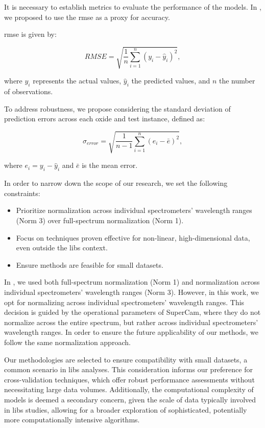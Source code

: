 It is necessary to establish metrics to evaluate the performance of the models.
In \cite{p9_paper}, we proposed to use the \gls{rmse} as a proxy for accuracy.

\gls{rmse} is given by:

\begin{equation}
    RMSE = \sqrt{\frac{1}{n} \sum_{i=1}^{n} (y_i - \hat{y}_i)^2},
\end{equation}

where $y_i$ represents the actual values, $\hat{y}_i$ the predicted values, and $n$ the number of observations.

To address robustness, we propose considering the standard deviation of prediction errors across each oxide and test instance, defined as:

\begin{equation}
    \sigma_{error} = \sqrt{\frac{1}{n-1} \sum_{i=1}^{n} (e_i - \bar{e})^2},
\end{equation}

where $e_i = y_i - \hat{y}_i$ and $\bar{e}$ is the mean error.

In order to narrow down the scope of our research, we set the following constraints:
\begin{itemize}
    \item Prioritize normalization across individual spectrometers' wavelength ranges (Norm 3) over full-spectrum normalization (Norm 1).
    \item Focus on techniques proven effective for non-linear, high-dimensional data, even outside the \gls{libs} context.
    \item Ensure methods are feasible for small datasets.
\end{itemize}

In \cite{p9_paper}, we used both full-spectrum normalization (Norm 1) and normalization across individual spectrometers' wavelength ranges (Norm 3).
However, in this work, we opt for normalizing across individual spectrometers' wavelength ranges.
This decision is guided by the operational parameters of SuperCam\cite{andersonPostlandingMajorElement2022}, where they do not normalize across the entire spectrum, but rather across individual spectrometers' wavelength ranges.
In order to ensure the future applicability of our methods, we follow the same normalization approach.

Our methodologies are selected to ensure compatibility with small datasets, a common scenario in \gls{libs} analyses.
This consideration informs our preference for cross-validation techniques, which offer robust performance assessments without necessitating large data volumes.
Additionally, the computational complexity of models is deemed a secondary concern, given the scale of data typically involved in \gls{libs} studies, allowing for a broader exploration of sophisticated, potentially more computationally intensive algorithms.

